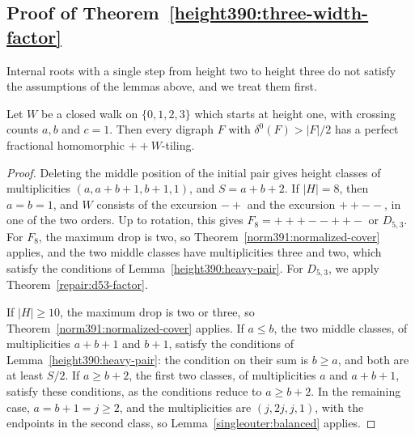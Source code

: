 \subsection{Proof of Theorem~\ref{height390:three-width-factor}}\label{sec:spanthree-proof}
Internal roots with a single step from height two to height three do not satisfy the assumptions of the lemmas above, and we treat them first.

\begin{lemma}
\label{height390:one-top}
Let $W$ be a closed walk on $\{0,1,2,3\}$ which starts at height one, with crossing counts $a,b$ and $c=1$. Then every digraph $F$ with $\delta^0(F)>|F|/2$ has a perfect fractional
homomorphic $++W$-tiling.
\end{lemma}
\begin{proof}
Deleting the middle position of the initial pair gives height classes of multiplicities
$(a,a+b+1,b+1,1)$, and $S=a+b+2$. If $|H|=8$,
then $a=b=1$, and $W$ consists of the excursion $-+$ and the excursion $++--$, in one of the two orders. Up to rotation, this gives
$F_8=+++--++-$ or $D_{5,3}$. For $F_8$, the maximum drop is two, so Theorem~\ref{norm391:normalized-cover} applies, and the two middle classes have multiplicities three and two, which satisfy the conditions of
Lemma~\ref{height390:heavy-pair}. For $D_{5,3}$, we apply Theorem~\ref{repair:d53-factor}.

If $|H|\ge10$, the maximum drop is two or three, so
Theorem~\ref{norm391:normalized-cover} applies. If $a\le b$, the two middle classes, of multiplicities $a+b+1$ and $b+1$, satisfy the conditions of Lemma~\ref{height390:heavy-pair}: the condition on their sum is $b\ge a$, and
both are at least $S/2$. If $a\ge b+2$, the first two classes, of multiplicities $a$ and $a+b+1$, satisfy these conditions, as the conditions reduce to $a\ge b+2$.
In the remaining case, $a=b+1=j\ge2$, and the multiplicities are
$(j,2j,j,1)$, with the endpoints in the second class, so Lemma~\ref{singleouter:balanced} applies.
\end{proof}


